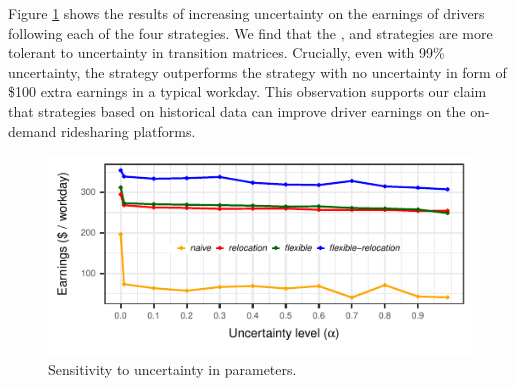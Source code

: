 Figure \ref{fig:uncertainty_evolution} shows the results of increasing uncertainty on the earnings of drivers following each of the four strategies. We find that the {\relocation}, {\flexible} and {\relocationflexible} strategies are more tolerant to uncertainty in transition matrices. Crucially, even with 99\% uncertainty, the {\relocationflexible} strategy outperforms the {\naive} strategy with no uncertainty in form of \$100 extra earnings in a typical workday. This observation supports our claim that strategies based on historical data can improve driver earnings on the on-demand ridesharing platforms. 

\begin{figure}[H]
	\centering
	\includegraphics{figures/uncertainty_evolution.pdf}
	\caption{Sensitivity to uncertainty in parameters.}
	\label{fig:uncertainty_evolution}
\end{figure}




